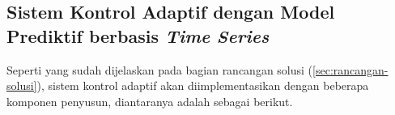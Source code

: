\subsection{Sistem Kontrol Adaptif dengan Model Prediktif berbasis \textit{Time Series}}

Seperti yang sudah dijelaskan pada bagian rancangan solusi (\ref{sec:rancangan-solusi}), sistem kontrol adaptif akan diimplementasikan dengan beberapa komponen penyusun, diantaranya adalah sebagai berikut.

